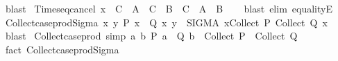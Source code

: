 \begin{isabellebody}
\endisadelimproof
%
\isatagproof
{}\isamarkupfalse%
\ blast%
\endisatagproof
{\isafoldproof}%
%
\isadelimproof
\isanewline
%
\endisadelimproof
\isanewline
{}\isamarkupfalse%
\ Times{\isacharunderscore}{\kern0pt}eq{\isacharunderscore}{\kern0pt}cancel{}{\isacharcolon}{\kern0pt}\ {\isachardoublequoteopen}x\ {\isasymin}\ C\ {\isasymLongrightarrow}\ A\ {\isasymtimes}\ C\ {\isacharequal}{\kern0pt}\ B\ {\isasymtimes}\ C\ {\isasymlongleftrightarrow}\ A\ {\isacharequal}{\kern0pt}\ B{\isachardoublequoteclose}\isanewline
%
\isadelimproof
\ \ %
\endisadelimproof
%
\isatagproof
{}\isamarkupfalse%
\ {\isacharparenleft}{\kern0pt}blast\ elim{\isacharcolon}{\kern0pt}\ equalityE{\isacharparenright}{\kern0pt}%
\endisatagproof
{\isafoldproof}%
%
\isadelimproof
\isanewline
%
\endisadelimproof
\isanewline
{}\isamarkupfalse%
\ Collect{\isacharunderscore}{\kern0pt}case{\isacharunderscore}{\kern0pt}prod{\isacharunderscore}{\kern0pt}Sigma{\isacharcolon}{\kern0pt}\ {\isachardoublequoteopen}{\isacharbraceleft}{\kern0pt}{\isacharparenleft}{\kern0pt}x{\isacharcomma}{\kern0pt}\ y{\isacharparenright}{\kern0pt}{\isachardot}{\kern0pt}\ P\ x\ {\isasymand}\ Q\ x\ y{\isacharbraceright}{\kern0pt}\ {\isacharequal}{\kern0pt}\ {\isacharparenleft}{\kern0pt}SIGMA\ x{\isacharcolon}{\kern0pt}Collect\ P{\isachardot}{\kern0pt}\ Collect\ {\isacharparenleft}{\kern0pt}Q\ x{\isacharparenright}{\kern0pt}{\isacharparenright}{\kern0pt}{\isachardoublequoteclose}\isanewline
%
\isadelimproof
\ \ %
\endisadelimproof
%
\isatagproof
{}\isamarkupfalse%
\ blast%
\endisatagproof
{\isafoldproof}%
%
\isadelimproof
\isanewline
%
\endisadelimproof
\isanewline
{}\isamarkupfalse%
\ Collect{\isacharunderscore}{\kern0pt}case{\isacharunderscore}{\kern0pt}prod\ {\isacharbrackleft}{\kern0pt}simp{\isacharbrackright}{\kern0pt}{\isacharcolon}{\kern0pt}\ {\isachardoublequoteopen}{\isacharbraceleft}{\kern0pt}{\isacharparenleft}{\kern0pt}a{\isacharcomma}{\kern0pt}\ b{\isacharparenright}{\kern0pt}{\isachardot}{\kern0pt}\ P\ a\ {\isasymand}\ Q\ b{\isacharbraceright}{\kern0pt}\ {\isacharequal}{\kern0pt}\ Collect\ P\ {\isasymtimes}\ Collect\ Q\ {\isachardoublequoteclose}\isanewline
%
\isadelimproof
\ \ %
\endisadelimproof
%
\isatagproof
{}\isamarkupfalse%
\ {\isacharparenleft}{\kern0pt}fact\ Collect{\isacharunderscore}{\kern0pt}case{\isacharunderscore}{\kern0pt}prod{\isacharunderscore}{\kern0pt}Sigma{\isacharparenright}{\kern0pt}%
\endisatagproof
{\isafoldproof}%
%
\isadelimproof
\isanewline
%
\endisadelimproof
\isanewline
{}\isamarkupfalse%

\end{isabellebody}

